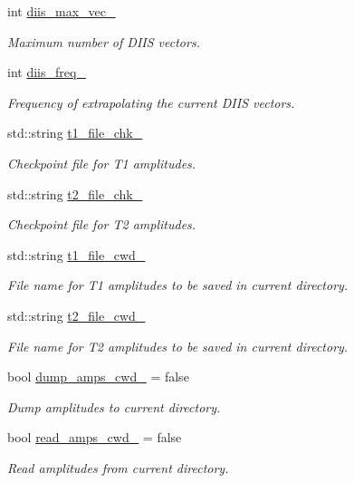 \begin{DoxyCompactItemize}
int \mbox{\hyperlink{classforte_1_1_dynamic_correlation_solver_a8f7c491f8d339d3ec9cba80ad02d10fa}{diis\+\_\+max\+\_\+vec\+\_\+}}
\begin{DoxyCompactList}\small\item\em Maximum number of D\+I\+IS vectors. \end{DoxyCompactList}\item 
int \mbox{\hyperlink{classforte_1_1_dynamic_correlation_solver_acd0fdabf84f31c7d115a89b6b7fe9af6}{diis\+\_\+freq\+\_\+}}
\begin{DoxyCompactList}\small\item\em Frequency of extrapolating the current D\+I\+IS vectors. \end{DoxyCompactList}\item 
std\+::string \mbox{\hyperlink{classforte_1_1_dynamic_correlation_solver_a394952f010dae1c06893c03acca808e8}{t1\+\_\+file\+\_\+chk\+\_\+}}
\begin{DoxyCompactList}\small\item\em Checkpoint file for T1 amplitudes. \end{DoxyCompactList}\item 
std\+::string \mbox{\hyperlink{classforte_1_1_dynamic_correlation_solver_aef52805c0fd6b82f19ea598cec8f3fc6}{t2\+\_\+file\+\_\+chk\+\_\+}}
\begin{DoxyCompactList}\small\item\em Checkpoint file for T2 amplitudes. \end{DoxyCompactList}\item 
std\+::string \mbox{\hyperlink{classforte_1_1_dynamic_correlation_solver_ab651c3efceb41dfe20c9c55d3e6aeac5}{t1\+\_\+file\+\_\+cwd\+\_\+}}
\begin{DoxyCompactList}\small\item\em File name for T1 amplitudes to be saved in current directory. \end{DoxyCompactList}\item 
std\+::string \mbox{\hyperlink{classforte_1_1_dynamic_correlation_solver_aeffaac4dffe7b8a38b625f466edb8781}{t2\+\_\+file\+\_\+cwd\+\_\+}}
\begin{DoxyCompactList}\small\item\em File name for T2 amplitudes to be saved in current directory. \end{DoxyCompactList}\item 
bool \mbox{\hyperlink{classforte_1_1_dynamic_correlation_solver_a94f8a814fc383e80ac628a6c08d0fff2}{dump\+\_\+amps\+\_\+cwd\+\_\+}} = false
\begin{DoxyCompactList}\small\item\em Dump amplitudes to current directory. \end{DoxyCompactList}\item 
bool \mbox{\hyperlink{classforte_1_1_dynamic_correlation_solver_aa1c91323000f21d7c2ba0af5ccb51df7}{read\+\_\+amps\+\_\+cwd\+\_\+}} = false
\begin{DoxyCompactList}\small\item\em Read amplitudes from current directory. \end{DoxyCompactList}\end{DoxyCompactItemize}


